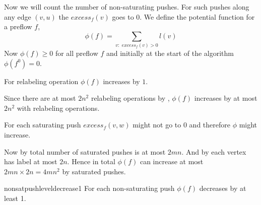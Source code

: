 Now we will count the number of non-saturating pushes. For such pushes along any edge $(v,u)$ the $\textit{excess}_f(v)$ goes to $0$. We define the potential function for a preflow $f$, $$\phi(f)=\sum_{v:\textit{ excess}_f(v)>0}l(v)$$Now $\phi(f)\geq 0$ for all preflow $f$ and initially at the start of the algorithm $\phi(f^0)=0$. 
\begin{observation}
	For relabeling operation $\phi(f)$ increases by $1$.
\end{observation}
Since there are at most $2n^2$ relabeling operations by  , $\phi(f)$ increases by at most $2n^2$ with relabeling operations.
\begin{observation}
	For each saturating push $\textit{excess}_f(v,w)$ might not go to $0$ and therefore $\phi$ might increase.
\end{observation}
Now by  total number of saturated pushes is at most $2mn$. And by  each vertex has label at most $2n$. Hence in total $\phi(f)$ can increase at most $2mn\times 2n=4mn^2$ by saturated pushes.
\begin{lemma}{}{nonsatpushleveldecrease1}
	For each non-saturating push  $\phi(f)$ decreases by at least 1.
\end{lemma}
